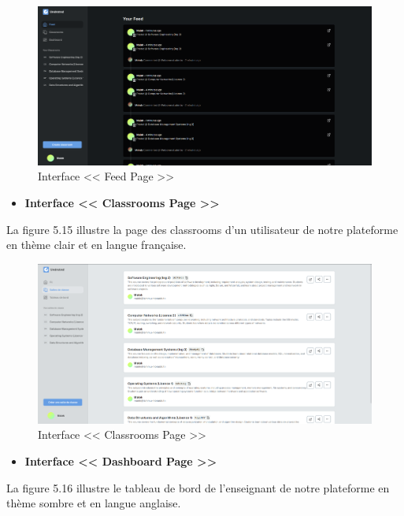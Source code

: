 \begin{figure}[H]
    \centering
    \includegraphics[width=1.1\textwidth,height=0.5\textwidth]{images/chp5/fig14.png}
    \caption{Interface << Feed Page >>}
    \label{Interface << Feed Page >>}    
\end{figure}
\begin{itemize}
    \item \textbf{Interface << Classrooms Page >>}
\end{itemize}
La figure 5.15 illustre la page des classrooms d'un utilisateur de notre plateforme en thème clair et en langue française.
\begin{figure}[H]
    \centering
    \includegraphics[width=1.1\textwidth,height=0.5\textwidth]{images/chp5/fig15.png}
    \caption{Interface << Classrooms Page >>}
    \label{Interface << Classrooms Page >>}    
\end{figure}
\begin{itemize}
    \item \textbf{Interface << Dashboard Page >>}
\end{itemize}
La figure 5.16 illustre le tableau de bord de l'enseignant de notre plateforme en thème sombre et en langue anglaise.
